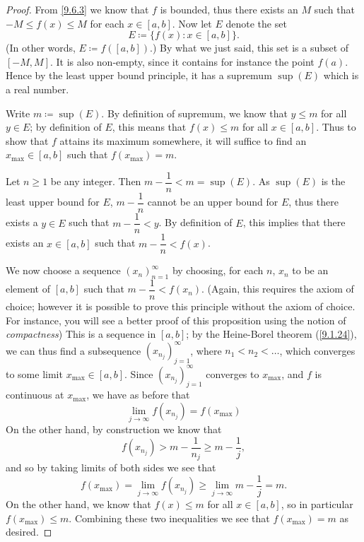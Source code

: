 \begin{proof}
  From \cref{9.6.3} we know that \(f\) is bounded, thus there exists an \(M\) such that \(-M \leq f(x) \leq M\) for each \(x \in [a, b]\).
  Now let \(E\) denote the
  set
  \[
    E \coloneqq \{f(x) : x \in [a, b]\}.
  \]
  (In other words, \(E \coloneqq f([a, b])\).)
  By what we just said, this set is a subset of \([-M, M]\).
  It is also non-empty, since it contains for instance the point \(f(a)\).
  Hence by the least upper bound principle, it has a supremum \(\sup(E)\) which is a real number.

  Write \(m \coloneqq \sup(E)\).
  By definition of supremum, we know that \(y \leq m\) for all \(y \in E\);
  by definition of \(E\), this means that \(f(x) \leq m\) for all \(x \in [a, b]\).
  Thus to show that \(f\) attains its maximum somewhere, it will suffice to find an \(x_{\max} \in [a, b]\) such that \(f(x_{\max}) = m\).

  Let \(n \geq 1\) be any integer.
  Then \(m - \dfrac{1}{n} < m = \sup(E)\).
  As \(\sup(E)\) is the least upper bound for \(E\), \(m - \dfrac{1}{n}\) cannot be an upper bound for \(E\), thus there exists a \(y \in E\) such that \(m - \dfrac{1}{n} < y\).
  By definition of \(E\), this implies that there exists an \(x \in [a, b]\) such that \(m - \dfrac{1}{n} < f(x)\).

  We now choose a sequence \((x_n)_{n = 1}^\infty\) by choosing, for each \(n\), \(x_n\) to be an element of \([a, b]\) such that \(m - \dfrac{1}{n} < f(x_n)\).
  (Again, this requires the axiom of choice;
  however it is possible to prove this principle without the axiom of choice.
  For instance, you will see a better proof of this proposition using the notion of \emph{compactness})
  This is a sequence in \([a, b]\);
  by the Heine-Borel theorem (\cref{9.1.24}), we can thus find a subsequence \((x_{n_j})_{j = 1}^\infty\), where \(n_1 < n_2 < \dots\), which converges to some limit \(x_{\max} \in [a, b]\).
  Since \((x_{n_j})_{j = 1}^\infty\) converges to \(x_{\max}\), and \(f\) is continuous at \(x_{\max}\), we have as before that
  \[
    \lim_{j \to \infty} f(x_{n_j}) = f(x_{\max})
  \]
  On the other hand, by construction we know that
  \[
    f(x_{n_j}) > m - \dfrac{1}{n_j} \geq m - \dfrac{1}{j},
  \]
  and so by taking limits of both sides we see that
  \[
    f(x_{\max}) = \lim_{j \to \infty} f(x_{n_j}) \geq \lim_{j \to \infty} m - \dfrac{1}{j} = m.
  \]
  On the other hand, we know that \(f(x) \leq m\) for all \(x \in [a, b]\), so in particular \(f(x_{\max}) \leq m\).
  Combining these two inequalities we see that \(f(x_{\max}) = m\) as desired.


\end{proof}
